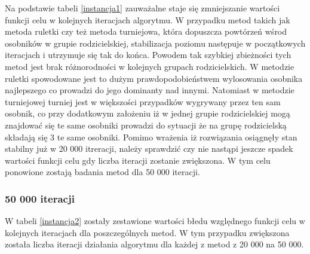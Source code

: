 Na podstawie tabeli \ref{instancja1} zauważalne staje się zmniejszanie wartości funkcji celu w kolejnych iteracjach algorytmu.  W przypadku metod takich jak metoda ruletki czy też metoda turniejowa, która dopuszcza powtórzeń wśrod osobników w grupie rodzicielskiej, stabilizacja poziomu następuje w początkowych iteracjach i utrzymuje się tak do końca. Powodem tak szybkiej zbieżności tych metod jest brak różnorodności w kolejnych grupach rodzicielskich. W metodzie ruletki spowodowane jest to dużym prawdopodobieństwem wylosowania osobnika najlepszego co prowadzi do jego dominanty nad innymi. Natomiast w metodzie  turniejowej turniej jest w większości przypadków wygrywany przez ten sam osobnik, co przy dodatkowym założeniu iż w jednej grupie rodzicielskiej mogą znajdować się te same osobniki prowadzi do sytuacji że na grupę rodzicielską składają się 3 te same osobniki. Pomimo wrażenia iż rozwiązania osiągnęły stan stabilny już w 20 000 itreracji, należy sprawdzić czy nie nastąpi jeszcze spadek wartości funkcji celu gdy liczba iteracji zostanie zwiększona. W tym celu ponowione zostają badania metod dla 50 000 iteracji.\\

\subsubsection{50 000 iteracji}

 W tabeli \ref{instancja2} zostały zestawione wartości błedu względnego funkcji celu w kolejnych iteracjach dla poszczególnych metod. W tym przypadku zwiększona została liczba iteracji działania algorytmu dla każdej z metod z 20 000 na 50 000. 

